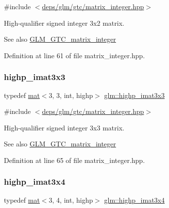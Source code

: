 {\ttfamily \#include $<$\hyperlink{matrix__integer_8hpp}{deps/glm/gtc/matrix\+\_\+integer.\+hpp}$>$}

High-\/qualifier signed integer 3x2 matrix. \begin{DoxySeeAlso}{See also}
\hyperlink{group__gtc__matrix__integer}{G\+L\+M\+\_\+\+G\+T\+C\+\_\+matrix\+\_\+integer} 
\end{DoxySeeAlso}


Definition at line 61 of file matrix\+\_\+integer.\+hpp.

\mbox{\label{group__gtc__matrix__integer_ga56dfcd09960c88895e72cbdcddc08ae6}} 
\subsubsection{\texorpdfstring{highp\+\_\+imat3x3}{highp\_imat3x3}}
{\footnotesize\ttfamily typedef \hyperlink{structglm_1_1mat}{mat}$<$3, 3, int, highp$>$ \hyperlink{group__gtc__matrix__integer_ga56dfcd09960c88895e72cbdcddc08ae6}{glm\+::highp\+\_\+imat3x3}}



{\ttfamily \#include $<$\hyperlink{matrix__integer_8hpp}{deps/glm/gtc/matrix\+\_\+integer.\+hpp}$>$}

High-\/qualifier signed integer 3x3 matrix. \begin{DoxySeeAlso}{See also}
\hyperlink{group__gtc__matrix__integer}{G\+L\+M\+\_\+\+G\+T\+C\+\_\+matrix\+\_\+integer} 
\end{DoxySeeAlso}


Definition at line 65 of file matrix\+\_\+integer.\+hpp.

\mbox{\label{group__gtc__matrix__integer_ga01595d765e0fef9bf01df5e20a811cd3}} 
\subsubsection{\texorpdfstring{highp\+\_\+imat3x4}{highp\_imat3x4}}
{\footnotesize\ttfamily typedef \hyperlink{structglm_1_1mat}{mat}$<$3, 4, int, highp$>$ \hyperlink{group__gtc__matrix__integer_ga01595d765e0fef9bf01df5e20a811cd3}{glm\+::highp\+\_\+imat3x4}}



